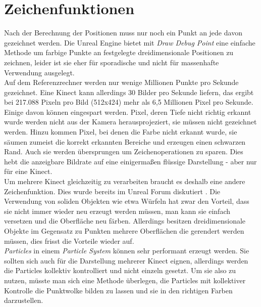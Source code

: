 \documentclass[a4paper]{IEEEtran}
\begin{document}
\section{Zeichenfunktionen}
	Nach der Berechnung der Positionen muss nur noch ein Punkt an jede davon gezeichnet werden. 
	Die Unreal Engine bietet mit {\textit{Draw Debug Point}} eine einfache Methode um farbige Punkte an festgelegte dreidimensionale Positionen zu zeichnen, leider ist sie eher für sporadische und nicht für massenhafte Verwendung ausgelegt. \\
	Auf dem Referenzrechner werden nur wenige Millionen Punkte pro Sekunde gezeichnet. 
	Eine Kinect kann allerdings 30 Bilder pro Sekunde liefern, das ergibt bei 217.088 Pixeln pro Bild (512x424) mehr als 6,5 Millionen Pixel pro Sekunde. \\
	Einige davon können eingespart werden. 
	Pixel, deren Tiefe nicht richtig erkannt wurde werden nicht aus der Kamera herausprojeziert, sie müssen nicht gezeichnet werden. 
	Hinzu kommen Pixel, bei denen die Farbe nicht erkannt wurde, sie säumen zumeist die korrekt erkannten Bereiche und erzeugen einen schwarzen Rand. 
	Auch sie werden übersprungen um Zeichenoperationen zu sparen. 
	Dies hebt die anzeigbare Bildrate auf eine einigermaßen flüssige Darstellung - aber nur für eine Kinect. \\
	Um mehrere Kinect gleichzeitig zu verarbeiten braucht es deshalb eine andere Zeichenfunktion.
	Dies wurde bereits im Unreal Forum diskutiert {\cite{lidar}}.
	Die Verwendung von soliden Objekten wie etwa Würfeln hat zwar den Vorteil, dass sie nicht immer wieder neu erzeugt werden müssen, man kann sie einfach versetzen und die Oberfläche neu färben. 
	Allerdings besitzen dreidimensionale Objekte im Gegensatz zu Punkten mehrere Oberflächen die gerendert werden müssen, dies frisst die Vorteile wieder auf.\\
	{\textit{Particles}} in einem {\textit{Particle System}} können sehr performant erzeugt werden. 
	Sie sollten sich auch für die Darstellung mehrerer Kinect eignen, allerdings werden die Particles kollektiv kontrolliert und nicht einzeln gesetzt. 
	Um sie also zu nutzen, müsste man sich eine Methode überlegen, die Particles mit kollektiver Kontrolle die Punktwolke bilden zu lassen und sie in den richtigen Farben darzustellen. \\[0.5cm]
	
	
\end{document}
